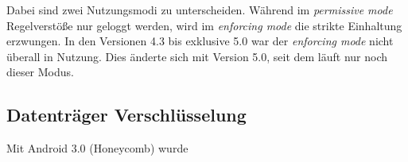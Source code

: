 	Dabei sind zwei Nutzungsmodi zu unterscheiden. Während im \textit{permissive mode} Regelverstöße nur geloggt werden, wird im \textit{enforcing mode} die strikte Einhaltung erzwungen. In den Versionen 4.3 bis exklusive 5.0 war der \textit{enforcing mode} nicht überall in Nutzung. Dies änderte sich mit Version 5.0, seit dem läuft nur noch dieser Modus.
	
	\subsection{Datenträger Verschlüsselung}
	Mit Android 3.0 (Honeycomb) wurde 
	 
	
	

	